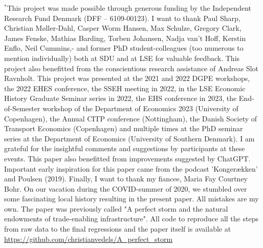 \documentclass[11pt]{article}
\begin{document}
\begin{titlepage}
    \footnotesize
    $^*$This project was made possible through generous funding by the Independent Research Fund Denmark (DFF – 6109-00123). I want to thank Paul Sharp, Christian Møller-Dahl, Casper Worm Hansen, Max Schulze, Gregory Clark, James Fenske, Mathias Barding, Torben Johansen, Nadja van't Hoff, Kerstin Enflo, Neil Cummins,- and former PhD student-colleagues (too numerous to mention individually) both at SDU and at LSE for valuable feedback. This project also benefitted from the conscientious research assistance of Andreas Slot Ravnholt. This project was presented at the 2021 and 2022 DGPE workshops, the 2022 EHES conference, the SSEH meeting in 2022, in the LSE Economic History Graduate Seminar series in 2022, the EHS conference in 2023, the End-of-Semester workshop of the Department of Economics 2023 (University of Copenhagen), the Annual CITP conference (Nottingham), the Danish Society of Transport Economics (Copenhagen) and multiple times at the PhD seminar series at the Department of Economics (University of Southern Denmark). I am grateful for the insightful comments and suggestions by participants at these events. This paper also benefitted from improvements suggested by ChatGPT. Important early inspiration for this paper came from the podcast 'Kongerækken' and Poulsen (2019). Finally, I want to thank my fiancee, Maria Fay Courtney Bohr. On our vacation during the COVID-summer of 2020, we stumbled over some fascinating local history resulting in the present paper.  All mistakes are my own. The paper was previously called "A perfect storm and the natural endowments of trade-enabling infrastructure". All code to reproduce all the steps from raw data to the final regressions and the paper itself is available at \url{https://github.com/christianvedels/A_perfect_storm}

\end{titlepage}
\newpage
\end{document}
